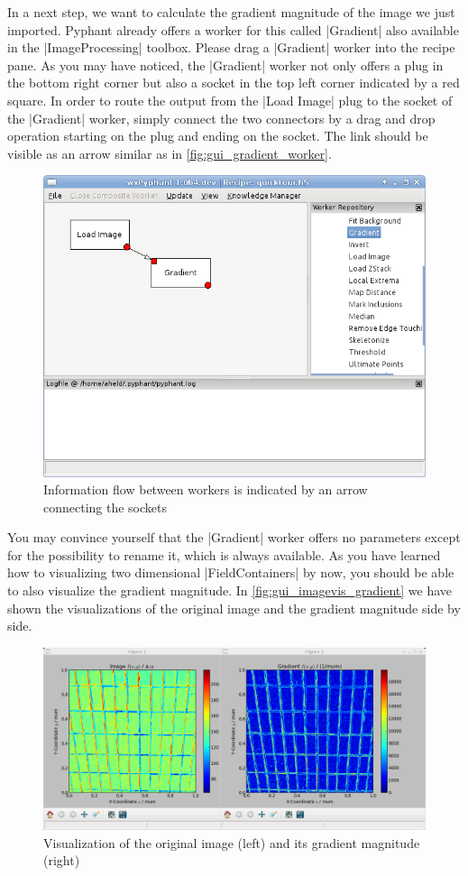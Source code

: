 \documentclass[a4paper]{article}
\begin{document}
In a next step, we want to calculate the gradient magnitude of the
image we just imported. Pyphant already offers a worker for this
called |Gradient| also available in the |ImageProcessing|
toolbox. Please drag a |Gradient| worker into the recipe pane. As you
may have noticed, the |Gradient| worker not only offers a plug in
the bottom right corner but also a socket in the top left corner
indicated by a red square. In order to route the output from the |Load Image|
plug to the socket of the |Gradient| worker, simply connect
the two connectors by a drag and drop operation starting on the plug
and ending on the socket. The link should be visible as an
arrow similar as in \autoref{fig:gui_gradient_worker}.
\begin{figure}[h]
  \centering
  \includegraphics[scale=0.75]{fig/gui_gradient_worker.png}
  \caption{Information flow between workers is indicated by an
  arrow connecting the sockets}
  \label{fig:gui_gradient_worker}
\end{figure}
You may convince yourself that the |Gradient| worker offers no
parameters except for the possibility to rename it, which is always
available. As you have learned how to visualizing two dimensional
|FieldContainers| by now, you should be able to also visualize the
gradient magnitude. In \autoref{fig:gui_imagevis_gradient} we have shown
the visualizations of the original image and the gradient magnitude
side by side.
\begin{figure}[h]
  \centering
  \includegraphics[width=\linewidth]{fig/gui_imagevis_gradient.png}
  \caption{Visualization of the original image (left) and its gradient
    magnitude (right)}
  \label{fig:gui_imagevis_gradient}
\end{figure}
\end{document}
